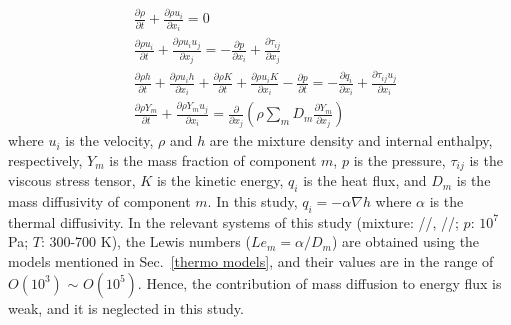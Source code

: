 \begin{align}
     & \frac{\partial \rho}{\partial t}+\frac{\partial \rho u_i}{\partial x_i}=0 \label{G:start}                                                                                                                                                                            \\
     & \frac{\partial \rho u_i}{\partial t}+\frac{\partial \rho u_i u_j}{\partial x_j}=-\frac{\partial p}{\partial x_i}+\frac{\partial \tau_{ij}}{\partial x_j} \label{Gm}                                                                                                   \\
     & \frac{\partial \rho h}{\partial t}+\frac{\partial \rho u_i h}{\partial x_i}+\frac{\partial \rho K}{\partial t}+\frac{\partial \rho u_i K}{\partial x_i}-\frac{\partial p}{\partial t}=-\frac{\partial q_i}{\partial x_i} +\frac{\partial \tau_{ij}u_j}{\partial x_i} \\
     & \frac{\partial \rho Y_m}{\partial t}+\frac{\partial \rho Y_m u_j}{\partial x_i}=\frac{\partial }{\partial x_j}\left(\rho \sum_m D_m \frac{\partial Y_m}{\partial x_j}\right) \label{G:end}
\end{align}
where $u_i$ is the velocity, $\rho$ and $h$ are the mixture density and internal enthalpy, respectively, $Y_m$ is the mass fraction of component $m$, $p$ is the pressure, $\tau_{ij}$ is the viscous stress tensor, $K$ is the kinetic energy, $q_i$ is the heat flux, and $D_m$ is the mass diffusivity of component $m$.
In this study, $q_i=-\alpha \nabla h$ where $\alpha$ is the thermal diffusivity. In the relevant systems of this study (mixture: //, //; $p$: $10^7$ Pa; $T$: 300-700 K), the Lewis numbers ($Le_m=\alpha/D_m$) are obtained using the models mentioned in Sec.~\ref{thermo models}, and their values are in the range of $O(10^3)$ $\sim$ $O(10^5)$. Hence, the contribution of mass diffusion to energy flux is weak, and it is neglected in this study.

